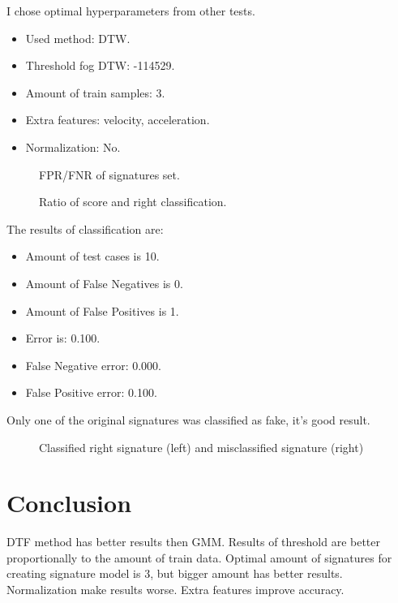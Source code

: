 \documentclass{article}
\begin{document}
\newpage

I chose optimal hyperparameters from other tests. 

\begin{itemize}
  \item Used method: DTW.
  \item Threshold fog DTW: -114529.
  \item Amount of train samples: 3.
  \item Extra features: velocity, acceleration.
  \item Normalization: No.
\end{itemize}

\begin{figure}[htbp] 
  \centering
  \def\svgscale{0.7}
  
  \caption{FPR/FNR of signatures set.}
  \label{fpr_fnr_own}
\end{figure}

\begin{figure}[htbp] 
  \centering
  \def\svgscale{0.3}
  
  \caption{Ratio of score and right classification.}
  \label{histogram_own}
\end{figure}

\newpage

The results of classification are:
\begin{itemize}
  \item Amount of test cases is 10.
  \item Amount of False Negatives is 0.
  \item Amount of False Positives is 1.
  \item Error is: 0.100.
  \item False Negative error: 0.000.
  \item False Positive error: 0.100.
\end{itemize}

Only one of the original signatures was classified as fake, it's good result.

\begin{figure}[htbp] 
  \centering
  \def\svgscale{0.7}
  
  \caption{Classified right signature (left) and misclassified signature (right)}
  \label{misclassified_signature}
\end{figure}

\section{Conclusion} DTF method has better results then GMM. Results of threshold are better proportionally to the amount of train data. Optimal amount of signatures for creating signature model is 3, but bigger amount has better results. Normalization make results worse. Extra features improve accuracy. 
\end{document}
